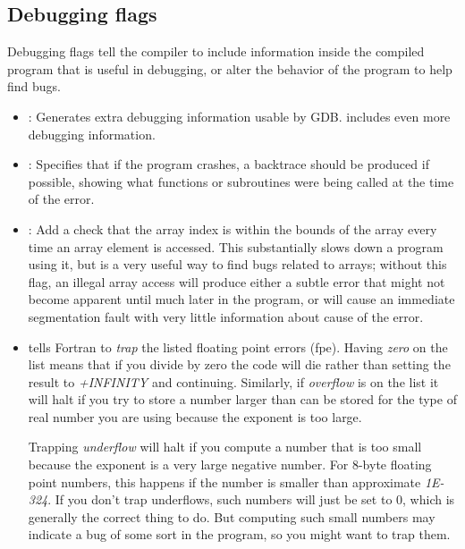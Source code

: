 \documentclass[letterpaper,10pt,english]{sphinxmanual}
\begin{document}
\subsection{Debugging flags}
\label{gfortran_flags:debugging-flags}
Debugging flags tell the compiler to include information inside the
compiled program that is useful in debugging, or alter the behavior of
the program to help find bugs.
\begin{itemize}
\item {} 
: Generates extra debugging information usable by GDB.
 includes even more debugging information.

\item {} 
: Specifies that if the program crashes, a backtrace
should be produced if possible, showing what functions or
subroutines were being called at the time of the error.

\item {} 
: Add a check that the array index is within the
bounds of the array every time an array element is accessed.  This
substantially slows down a program using it, but is a very useful
way to find bugs related to arrays; without this flag, an illegal
array access will produce either a subtle error that might not
become apparent until much later in the program, or will cause an
immediate segmentation fault with very little information about
cause of the error.

\item {} 
 tells Fortran to \emph{trap} the listed
floating point errors (fpe).  Having \emph{zero} on the list means that
if you divide by zero the code will die rather than setting the result to
\emph{+INFINITY} and continuing.  Similarly, if \emph{overflow} is on the list it
will halt if you try to store a number larger than can be stored for the
type of real number you are using because the exponent is too large.

Trapping \emph{underflow} will halt if you compute a number that is too small
because the exponent is a very large negative number.  For 8-byte
floating point numbers, this happens if the number is smaller than
approximate \emph{1E-324}.   If you don't trap underflows, such numbers will
just be set to 0, which is generally the correct thing to do.  But
computing such small numbers may indicate a bug of some sort in the
program, so you might want to trap them.

\end{itemize}
\end{document}
